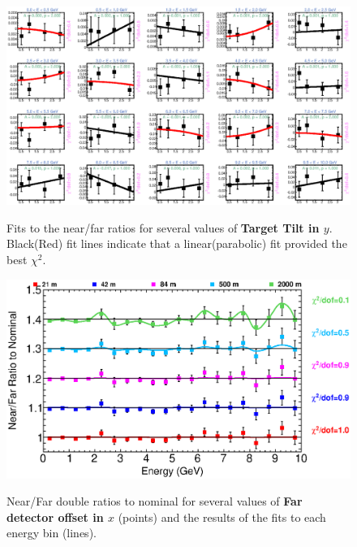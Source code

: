 {\begin{figure}[ht]
  \begin{center}
    {\includegraphics[width=5.0in]{figures/TargetYTilt_nof_fits.eps}}
  \end{center}
\caption{ Fits to the near/far ratios for several values of {\bf Target Tilt in $y$}. Black(Red) fit lines indicate that a linear(parabolic) fit provided the best $\chi^2$. }
\end{figure}


\begin{figure}[ht]
  \begin{center}
    {\includegraphics[width=6.0in]{figures/LBNEFDX_nof_summary.eps}}
  \end{center}
\caption{ Near/Far double ratios to nominal for several values of {\bf Far detector offset in $x$} (points) and the results of the fits to each energy bin (lines).}
\end{figure}

}
